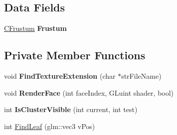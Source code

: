 \subsection*{Data Fields}
\begin{DoxyCompactItemize}
\item 
\hyperlink{class_c_frustum}{C\+Frustum} {\bfseries Frustum}\hypertarget{class_c_quake3_b_s_p_ab3535b50e4d79b894aad24c1960ad718}{}\label{class_c_quake3_b_s_p_ab3535b50e4d79b894aad24c1960ad718}

\end{DoxyCompactItemize}
\subsection*{Private Member Functions}
\begin{DoxyCompactItemize}
\item 
void {\bfseries Find\+Texture\+Extension} (char $\ast$str\+File\+Name)\hypertarget{class_c_quake3_b_s_p_a81aaf95313a6b9d59ea088042870bbca}{}\label{class_c_quake3_b_s_p_a81aaf95313a6b9d59ea088042870bbca}

\item 
void {\bfseries Render\+Face} (int face\+Index, G\+Luint shader, bool)\hypertarget{class_c_quake3_b_s_p_ad1775eac850f6057170f7009e9fba55d}{}\label{class_c_quake3_b_s_p_ad1775eac850f6057170f7009e9fba55d}

\item 
int {\bfseries Is\+Cluster\+Visible} (int current, int test)\hypertarget{class_c_quake3_b_s_p_a8e69e5687f268bc56bff5faf341d597c}{}\label{class_c_quake3_b_s_p_a8e69e5687f268bc56bff5faf341d597c}

\item 
int \hyperlink{class_c_quake3_b_s_p_a82ab93b599790d05ebf7039aa811cee5}{Find\+Leaf} (glm\+::vec3 v\+Pos)
\end{DoxyCompactItemize}
